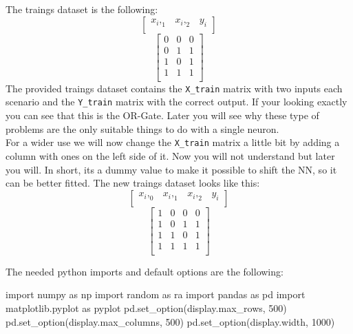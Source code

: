 \documentclass[
]{book}
\newenvironment{Shaded}{\begin{snugshade}}{\end{snugshade}}
\newcommand{\DecValTok}[1]{\textcolor[rgb]{0.00,0.00,0.81}{#1}}
\newcommand{\ImportTok}[1]{#1}
\newcommand{\NormalTok}[1]{#1}
\newcommand{\StringTok}[1]{\textcolor[rgb]{0.31,0.60,0.02}{#1}}
\begin{document}
The traings dataset is the following:
\[
\left[
\begin{array}{cc|c}
x_i,_1 & x_i,_2 & y_i \\
\end{array}
\right]
\]
\[
\left[
\begin{array}{cc|c}
0 & 0 & 0 \\
0 & 1 & 1 \\
1 & 0 & 1 \\
1 & 1 & 1 \\
\end{array}
\right]
\]
The provided traings dataset contains the \texttt{X\_train} matrix with two inputs each scenario and the \texttt{Y\_train} matrix with the correct output. If your looking exactly you can see that this is the OR-Gate. Later you will see why these type of problems are the only suitable things to do with a single neuron.\\
For a wider use we will now change the \texttt{X\_train} matrix a little bit by adding a column with ones on the left side of it. Now you will not understand but later you will. In short, its a dummy value to make it possible to shift the NN, so it can be better fitted. The new traings dataset looks like this:
\[
\left[
\begin{array}{ccc|c}
x_i,_0 & x_i,_1 & x_i,_2 & y_i \\
\end{array}
\right]
\]
\[
\left[
\begin{array}{ccc|c}
1 & 0 & 0 & 0 \\
1 & 0 & 1 & 1 \\
1 & 1 & 0 & 1 \\
1 & 1 & 1 & 1 \\
\end{array}
\right]
\]

The needed python imports and default options are the following:

\begin{Shaded}
\begin{Highlighting}[]
\ImportTok{import}\NormalTok{ numpy }\ImportTok{as}\NormalTok{ np}
\ImportTok{import}\NormalTok{ random }\ImportTok{as}\NormalTok{ ra}
\ImportTok{import}\NormalTok{ pandas }\ImportTok{as}\NormalTok{ pd}
\ImportTok{import}\NormalTok{ matplotlib.pyplot }\ImportTok{as}\NormalTok{ pyplot}
\NormalTok{pd.set\_option(}\StringTok{\textquotesingle{}display.max\_rows\textquotesingle{}}\NormalTok{, }\DecValTok{500}\NormalTok{)}
\NormalTok{pd.set\_option(}\StringTok{\textquotesingle{}display.max\_columns\textquotesingle{}}\NormalTok{, }\DecValTok{500}\NormalTok{)}
\NormalTok{pd.set\_option(}\StringTok{\textquotesingle{}display.width\textquotesingle{}}\NormalTok{, }\DecValTok{1000}\NormalTok{)}
\end{Highlighting}
\end{Shaded}
\end{document}
